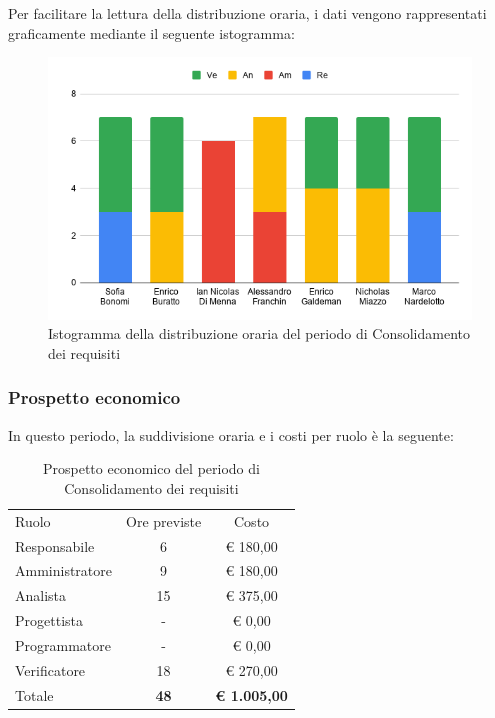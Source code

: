 \documentclass[../piano-di-progetto.tex]{subfiles}
\begin{document}
  Per facilitare la lettura della distribuzione oraria, i dati vengono rappresentati graficamente mediante il seguente istogramma:
  \begin{figure}[H]
    \centering
    \includegraphics[width=12cm]{img/ore-consolidamento.png}
    \caption{Istogramma della distribuzione oraria del periodo di Consolidamento dei requisiti}
    \label{fig:ore-componente-consolidamento}
  \end{figure}

  \subsubsection{Prospetto economico}
  In questo periodo, la suddivisione oraria e i costi per ruolo è la seguente:

  \begin{table}[H]
    \centering
    \begin{tabular}{lcc}
      Ruolo          & Ore previste & Costo      \\
      Responsabile   & 6            & € 180,00   \\
      Amministratore & 9            & € 180,00   \\
      Analista       & 15           & € 375,00   \\
      Progettista    & -            & € 0,00     \\
      Programmatore  & -            & € 0,00     \\
      Verificatore   & 18           & € 270,00   \\
      Totale         & \textbf{48}           & \textbf{€ 1.005,00}
    \end{tabular}
    \caption{Prospetto economico del periodo di Consolidamento dei requisiti}
  \end{table}
\end{document}
